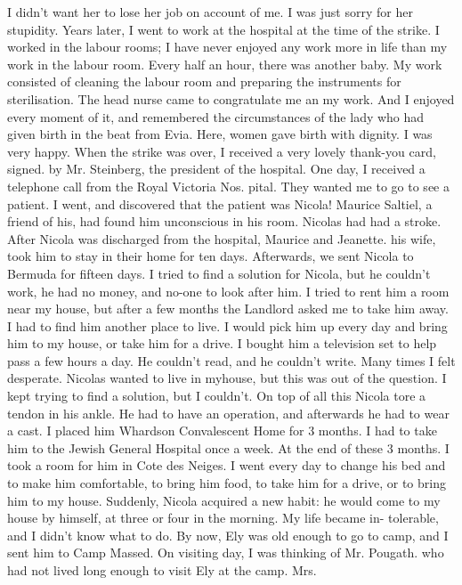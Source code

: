 I didn't want her to lose her 
job on account of me.
I was just sorry for her stupidity.
Years later, I went to work at the hospital at the time of the 
strike.
I worked in the labour rooms; I have never enjoyed any work more 
in life than my work in the labour room.
Every half an hour, there 
was another baby.
My work consisted of cleaning the labour room and preparing the instruments for sterilisation.
The head nurse came to congratulate me an my work.
And I enjoyed every moment of it, and remembered the circumstances of the lady who had given birth in the beat from Evia.
Here, women gave birth with dignity.
I was very happy.
When the strike 
was over, I received a very lovely thank-you card, signed.
by Mr.
Steinberg, the president of the hospital.
One day, I received a telephone call from the Royal Victoria Nos.
pital.
They wanted me to go to see a patient.
I went, and discovered
that the patient was Nicola!
Maurice Saltiel, a friend of his, had found 
him unconscious in his room.
Nicolas had had a stroke.
After Nicola was discharged from the hospital, Maurice and Jeanette.
his wife, took him to stay in their home for ten days.
Afterwards, we sent 
Nicola to Bermuda for fifteen days.
I tried to find a solution for Nicola, 
but he couldn't work, he had no money, and no-one to look after him.
I tried to rent him a room near my house, but after a few months the 
Landlord asked me to take him away.
I had to find him another place to live.
I would pick him up every day and bring him to my house, or take 
him for a drive.
I bought him a television set to help pass a few hours a day.
He couldn't read, and he couldn't write.
Many times I felt desperate.
Nicolas wanted to live in myhouse, but this was out of the question.
I kept trying to find a solution, but I couldn't.
On top of all this 
Nicola tore a tendon in his ankle.
He had to have an operation, and afterwards he had to wear a cast.
I placed him 
Whardson Convalescent Home for 3 months.
I had to take him to the 
Jewish General Hospital once a week.
At the end of these 3 months.
I took a room for him in Cote des 
Neiges.
I went every day to change his bed and to make him comfortable, to bring him food, to take him for a drive, or to bring him to my house.
Suddenly, Nicola acquired a new habit: he would come to my
house by himself, at three or four in the morning.
My life became in-
tolerable, and I didn't know what to do.
By now, Ely was old enough to go to camp, and I sent him to Camp 
Massed.
On visiting day, I was thinking of Mr.
Pougath.
who had not 
lived long enough to visit Ely at the camp.
Mrs.
